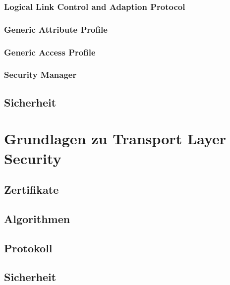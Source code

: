 \documentclass[doktyp=barbeit]{TUBAFarbeiten}
\begin{document}
		\subsubsection{Logical Link Control and Adaption Protocol}
			

		\subsubsection{Generic Attribute Profile}
			

		\subsubsection{Generic Access Profile}
			

		\subsubsection{Security Manager}
			

	\subsection{Sicherheit}
		

\newpage
\section{Grundlagen zu Transport Layer Security}

	\subsection{Zertifikate}

	\subsection{Algorithmen}

	\subsection{Protokoll}

	\subsection{Sicherheit}
\end{document}
